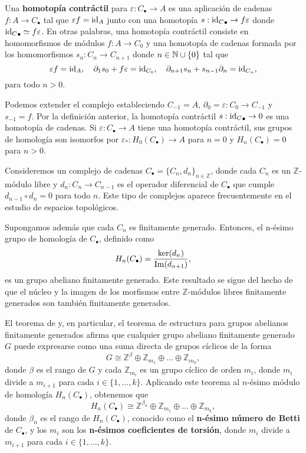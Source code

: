 \begin{definicion}
	\label{def:contr_homotopy} Una \textbf{homotopía contráctil} para
	\(\varepsilon: C_{\bullet}\to A\) es una aplicación de cadenas
	\(f: A \to C_{\bullet}\) tal que \(\varepsilon f = \operatorname{id}_{A}\) junto con una
	homotopía \(s:{\operatorname{id}_C}_{\bullet}\rightarrow f \varepsilon\) donde
	\({\operatorname{id}_C}_{\bullet}\simeq f \varepsilon\). En otras palabras, una homotopía
	contráctil consiste en homomorfismos de módulos \(f: A \to C_{0}\) y una homotopía de cadenas formada por los homomorfismos 
	\(s_{n}: C_{n}\to C_{n+1} \) donde $n \in \mathbb{N} \cup \{0\}$ tal que
	\[
	\varepsilon f = \operatorname{id}_{A}, \quad \partial_{1}s_{0}+ f \varepsilon = \operatorname{id}_{C_0},
	\quad \partial_{n+1}s_{n}+ s_{n-1}\partial_{n}= \operatorname{id}_{C_n},
	\]
	para todo $n > 0$.
\end{definicion}

Podemos extender el complejo estableciendo \(C_{-1}= A\), \(\partial_{0}= \varepsilon
: C_{0}\to C_{-1}\) y \(s_{-1}= f\). Por la definición anterior, la homotopía contráctil \(s:{\operatorname{id}_C}
_{\bullet}\rightarrow 0\) es una homotopía de cadenas. Si
\(\varepsilon: C_{\bullet}\to A\) tiene una homotopía contráctil, sus grupos de homología
son isomorfos por \(\varepsilon_{*}: H_{0}(C_{\bullet}) \rightarrow A\) para \(n = 0\)
y \(H_{n}(C_{\bullet}) = 0\) para \(n > 0\).

Consideremos un complejo de cadenas \(C_{\bullet}= \{ C_{n}, d_{n}\}_{n \in
	\mathbb{Z}}\), donde cada \(C_{n}\) es un \(\mathbb{Z}\)-módulo libre y
\(d_{n}: C_{n}\to C_{n-1}\) es el operador diferencial de \(C_{\bullet}\) que cumple
\(d_{n-1}\circ d_{n}= 0\) para todo \(n\). Este tipo de complejos aparece frecuentemente
en el estudio de espacios topológicos.

Supongamos además que cada \(C_{n}\) es finitamente generado. Entonces, el n-ésimo
grupo de homología de \(C_{\bullet}\), definido como
\[
H_{n}(C_{\bullet}) = \frac{\ker(d_{n})}{\operatorname{Im}(d_{n+1})},
\]
es un grupo abeliano finitamente generado. Este resultado se sigue del hecho de que
el núcleo y la imagen de los morfismos entre \(\mathbb{Z}\)-módulos libres finitamente
generados son también finitamente generados.

El teorema de  y, en particular, el teorema de
estructura para grupos abelianos finitamente generados afirma que cualquier
grupo abeliano finitamente generado \(G\) puede expresarse como una suma directa
de grupos cíclicos de la forma
\[
G \cong \mathbb{Z}^{\beta}\oplus \mathbb{Z}_{m_1}\oplus \ldots \oplus \mathbb{Z}
_{m_k},
\]
donde \(\beta\) es el rango de \(G\) y cada \(\mathbb{Z}_{m_i}\) es un grupo cíclico
de orden \(m_{i}\), donde \(m_{i}\) divide a \(m_{i+1}\) para cada \(i \in \{1, \ldots,
k\}\). Aplicando este teorema al $n$-ésimo módulo de homología \(H_{n}(C_{\bullet})\),
obtenemos que
\[
H_{n}(C_{\bullet}) \cong \mathbb{Z}^{\beta_n}\oplus \mathbb{Z}_{m_1}\oplus \ldots
\oplus \mathbb{Z}_{m_k},
\]
donde \(\beta_{n}\) es el rango de \(H_{n}(C_{\bullet})\), conocido como el \textbf{n-ésimo
	número de Betti} de \(C_{\bullet}\), y los \(m_{i}\) son los \textbf{n-ésimos
	coeficientes de torsión}, donde \(m_{i}\) divide a \(m_{i+1}\) para cada
\(i \in \{1, \ldots, k\}\).

